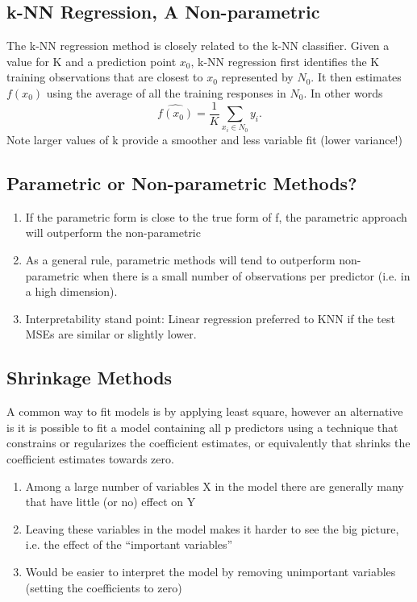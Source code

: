 \documentclass[12pt]{article}
\numberwithin{equation}{section}
\begin{document}
\subsection{k-NN Regression, A Non-parametric}
The k-NN regression method is closely related to the k-NN classifier. Given a value for K and a prediction point $x_0$, k-NN regression first identifies the K training observations that are closest to $x_0$ represented by $N_0$. It then estimates $f(x_0)$ using the average of all the training responses in $N_0$. In other words
\begin{equation}
    \hat{f(x_0)} = \frac{1}{K} \sum_{x_i \in N_0} y_i.
\end{equation}
Note larger values of k provide a smoother and less variable fit (lower variance!)

\subsection{Parametric or Non-parametric Methods?}
\begin{enumerate}
    \item  If the parametric form is close to the true form of f, the parametric approach will outperform the non-parametric
    \item As a general rule, parametric methods will tend to outperform non-parametric when there is a small number of observations per predictor (i.e. in a high dimension).
    \item Interpretability stand point: Linear regression preferred to KNN if the test MSEs are similar or slightly lower.
\end{enumerate}

\subsection{Shrinkage Methods}
A common way to fit models is by applying least square, however an alternative is it is possible to fit a model containing all p predictors using a technique that constrains or regularizes the coefficient estimates, or equivalently that shrinks the coefficient estimates towards zero.
\begin{enumerate}
    \item Among a large number of variables X in the model there are generally many that have little (or no) effect on Y
    \item Leaving these variables in the model makes it harder to see the big picture, i.e. the effect of the “important variables”
    \item Would be easier to interpret the model by removing unimportant variables (setting the coefficients to zero)
\end{enumerate}
\end{document}
